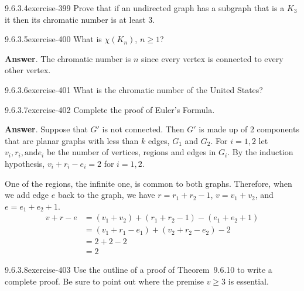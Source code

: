 \documentclass[twoside,10pt,]{book}
\numberwithin{equation}{section}
\begin{document}
\begin{divisionsolution}{9.6.3.4}{}{exercise-399}%
\hypertarget{p-3489}{}%
Prove that if an undirected graph has a subgraph that is a \(K_3\) it then its chromatic number is at least 3.%
\end{divisionsolution}%
\begin{divisionsolution}{9.6.3.5}{}{exercise-400}%
\hypertarget{p-3490}{}%
What is \(\chi \left(K_n\right)\), \(n\geq 1\)?%
\par\smallskip%
\noindent\textbf{Answer}.\quad%
\hypertarget{p-3491}{}%
The chromatic number is \(n\) since every vertex is connected to every other vertex.%
\end{divisionsolution}%
\begin{divisionsolution}{9.6.3.6}{}{exercise-401}%
\hypertarget{p-3492}{}%
What is the chromatic number of the United States?%
\end{divisionsolution}%
\begin{divisionsolution}{9.6.3.7}{}{exercise-402}%
\hypertarget{p-3493}{}%
Complete the proof of Euler's Formula.%
\par\smallskip%
\noindent\textbf{Answer}.\quad%
\hypertarget{p-3494}{}%
Suppose that \(G'\) is not connected. Then \(G'\) is made up of 2 components that are planar graphs with less than \(k\) edges, \(G_1\) and \(G_2\). For \(i=1,2\) let \(v_i,r_i, \text{and} e_i\) be the number of vertices, regions and edges in \(G_i\). By the induction hypothesis, \(v_i+r_i-e_i=2\) for \(i=1,2\).%
\par
\hypertarget{p-3495}{}%
One of the regions, the infinite one, is common to both graphs. Therefore, when we add edge \(e\) back to the graph, we have \(r=r_1+r_2-1\), \(v=v_1+v_2\), and  \(e=e_1+e_2+1\).%
\begin{equation*}
\begin{split}
v+r-e &=\left(v_1+v_2\right)+\left(r_1+r_2-1\right)-\left(e_1+e_2+1\right)\\
&=\left(v_1+r_1-e_1\right)+\left(v_2+r_2-e_2\right)-2\\
&=2 + 2 -2\\
&=2
\end{split}
\end{equation*}
%
\end{divisionsolution}%
\begin{divisionsolution}{9.6.3.8}{}{exercise-403}%
\hypertarget{p-3496}{}%
Use the outline of a proof of Theorem~9.6.10 to write a complete proof. Be sure to point out where the premise \(v\geq 3\) is essential.%
\end{divisionsolution}%
\end{document}
